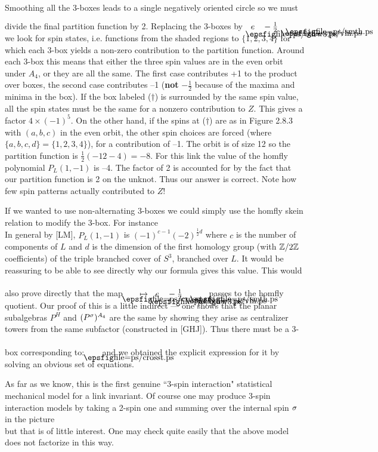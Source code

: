 Smoothing all the 3-boxes leads to a single negatively oriented
circle so we must divide the final partition function by 2.
Replacing the 3-boxes by $\boxe{e}-\frac12 \vln\ \  \smth$ we look for spin states, i.e. functions
from the shaded regions to $\{1,2,3,4\}$ for which each 3-box
yields a non-zero contribution to the partition function. Around
each 3-box this means that either the three spin values are in the
even orbit under
$A_4$, or they are all the same. The first case contributes +1  to
the product over boxes, the second case contributes --1 ({\bf not}
$-\frac 12$ because of the maxima and minima in the box). If the box labeled
($\dagger$) is surrounded by the same spin value, all the spin
states must be the same for a nonzero contribution to $Z$. This
gives a factor $4\times (-1)^5$. On the other hand, if the spins at
($\dagger$) are as in Figure 2.8.3 with $(a,b,c)$ in the even
orbit, the other spin
choices are forced (where $\{a,b,c,d\}=\{1,2,3,4\}$), for a
contribution of --1. The orbit is of size 12 so the partition
function is $\frac 12(-12-4)=-8$. For this link the value of the
{\sc homfly} polynomial $P_L(1,-1)$ is --4. The factor of 2 is
accounted for by the fact that our partition function is 2 on the
unknot. Thus our answer is correct. Note how few spin patterns
actually contributed to $Z$!

If we wanted to use non-alternating 3-boxes we could simply use the
{\sc homfly} skein relation to modify the 3-box. For instance
\[
        
\]
\ni In general by [LM], $P_L(1,-1)$ is $(-1)^{c-1}(-2)^{\frac
12 d}$ where $c$ is the number of components of $L$ and $d$ is the
dimension of the first homology group (with $\Bbb Z/2\Bbb Z$
coefficients) of the triple branched cover of $S^3$, branched over
$L$. It would be reassuring to be able to see directly why our
formula gives this value. This would also prove directly that the
map $\crsst\mapsto \boxe{e}-\frac{1}{2} \vln\ \ \smth$
passes to the {\sc homfly} quotient.
Our proof of this is a little indirect --- one shows that the
planar subalgebras $P^H$ and $(P^\sigma)^{A_4}$ are the same by showing
they arise as centralizer towers from the same subfactor
(constructed in [GHJ]). Thus there must be a 3-box
corresponding to: $\crsst$  and we obtained the explicit
expression for it by solving an obvious set of equations.

As far as we know, this is the first genuine ``3-spin interaction"
statistical mechanical model for a link invariant.
Of course one may produce 3-spin interaction models by taking a
2-spin one and summing over the internal spin $\sigma$ in the picture
\[
        
\]
\ni but that is of little interest. One may check quite easily that
the above model does not factorize in this way.

